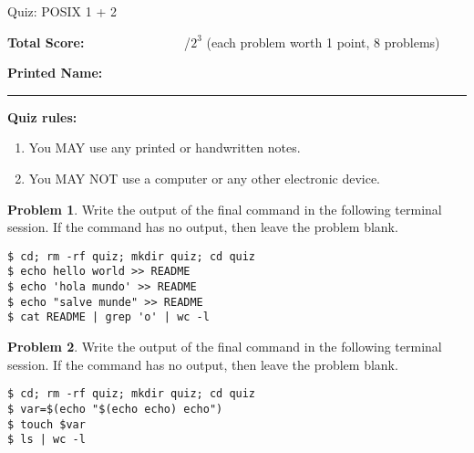 \documentclass[10pt]{article}
\theoremstyle{definition}
\newtheorem{problem}{Problem}
\begin{document}
\begin{center}
    {
\Large
    Quiz: POSIX 1 + 2
}


    \vspace{0.1in}
\end{center}

\vspace{0.15in}
\noindent
\textbf{Total Score:} ~~~~~~~~~~~~~~~/$2^3$ (each problem worth 1 point, 8 problems)

\vspace{0.2in}
\noindent
\textbf{Printed Name:}

\noindent
\rule{\textwidth}{0.1pt}
\vspace{0.15in}

\noindent
\textbf{Quiz rules:}
\begin{enumerate}
    \item You MAY use any printed or handwritten notes.
    \item You MAY NOT use a computer or any other electronic device.
\end{enumerate}

\noindent

\vspace{0.15in}

\filbreak\begin{problem}
    Write the output of the final command in the following terminal session.
    If the command has no output, then leave the problem blank.
\end{problem}
\begin{lstlisting}
$ cd; rm -rf quiz; mkdir quiz; cd quiz
$ echo hello world >> README
$ echo 'hola mundo' >> README
$ echo "salve munde" >> README
$ cat README | grep 'o' | wc -l
\end{lstlisting}
\vspace{1in}

\filbreak\begin{problem}
    Write the output of the final command in the following terminal session.
    If the command has no output, then leave the problem blank.
\end{problem}
\begin{lstlisting}
$ cd; rm -rf quiz; mkdir quiz; cd quiz
$ var=$(echo "$(echo echo) echo")
$ touch $var
$ ls | wc -l
\end{lstlisting}
\vspace{1in}
\end{document}

